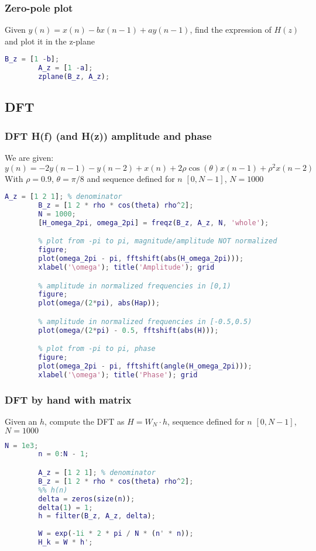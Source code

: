     \subsubsection{Zero-pole plot}
    Given $y(n)=x(n)-bx(n-1)+ay(n-1)$, find the expression of $H(z)$ and plot it in the z-plane
    \begin{lstlisting}[language=Matlab, escapeinside=`']
        B_z = [1 -b];
        A_z = [1 -a];
        zplane(B_z, A_z);
    \end{lstlisting}

\pagebreak\subsection{DFT}

    \subsubsection{DFT H(f) (and H(z)) amplitude and phase}
    We are given:
    $$
    y(n)=-2y(n-1)-y(n-2)+x(n)+2\rho\cos(\theta)x(n-1)+\rho^2x(n-2)
    $$
    With $\rho=0.9$, $\theta=\pi/8$ and sequence defined for $n$ $[0,N-1]$, $N=1000$
    \begin{lstlisting}[language=Matlab, escapeinside=`']
        A_z = [1 2 1]; % denominator
        B_z = [1 2 * rho * cos(theta) rho^2];
        N = 1000;
        [H_omega_2pi, omega_2pi] = freqz(B_z, A_z, N, 'whole');

        % plot from -pi to pi, magnitude/amplitude NOT normalized
        figure;
        plot(omega_2pi - pi, fftshift(abs(H_omega_2pi)));
        xlabel('\omega'); title('Amplitude'); grid

        % amplitude in normalized frequencies in [0,1)
        figure;
        plot(omega/(2*pi), abs(Hap));

        % amplitude in normalized frequencies in [-0.5,0.5)        
        plot(omega/(2*pi) - 0.5, fftshift(abs(H)));

        % plot from -pi to pi, phase
        figure;
        plot(omega_2pi - pi, fftshift(angle(H_omega_2pi)));
        xlabel('\omega'); title('Phase'); grid
    \end{lstlisting}

    \subsubsection{DFT by hand with matrix}
    Given an $h$, compute the DFT as $H=W_N\cdot h$, sequence defined for $n$ $[0,N-1]$, $N=1000$
    \begin{lstlisting}[language=Matlab, escapeinside=`']
        N = 1e3;
        n = 0:N - 1;

        A_z = [1 2 1]; % denominator
        B_z = [1 2 * rho * cos(theta) rho^2];
        %% h(n)
        delta = zeros(size(n));
        delta(1) = 1;
        h = filter(B_z, A_z, delta);
        
        W = exp(-1i * 2 * pi / N * (n' * n));
        H_k = W * h';
    \end{lstlisting}

